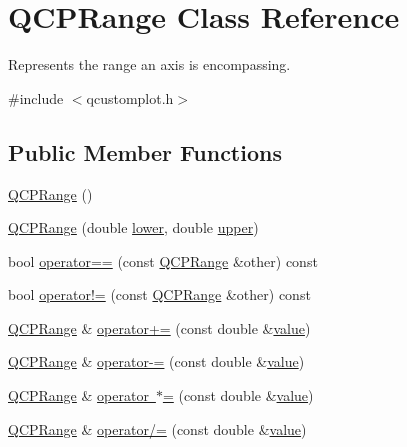 \hypertarget{class_q_c_p_range}{}\section{Q\+C\+P\+Range Class Reference}
\label{class_q_c_p_range}


Represents the range an axis is encompassing.  




{\ttfamily \#include $<$qcustomplot.\+h$>$}

\subsection*{Public Member Functions}
\begin{DoxyCompactItemize}
\item 
\mbox{\hyperlink{class_q_c_p_range_aca158d7e69702cee5d77d10a269b01e2}{Q\+C\+P\+Range}} ()
\item 
\mbox{\hyperlink{class_q_c_p_range_a1d9d84d084c8f368fdedd42e0978d405}{Q\+C\+P\+Range}} (double \mbox{\hyperlink{class_q_c_p_range_aa3aca3edb14f7ca0c85d912647b91745}{lower}}, double \mbox{\hyperlink{class_q_c_p_range_ae44eb3aafe1d0e2ed34b499b6d2e074f}{upper}})
\item 
bool \mbox{\hyperlink{class_q_c_p_range_a9f8d1fdcf4b6d19779f1c3d9a14b09c9}{operator==}} (const \mbox{\hyperlink{class_q_c_p_range}{Q\+C\+P\+Range}} \&other) const
\item 
bool \mbox{\hyperlink{class_q_c_p_range_a4827a37c83b8bb4bf53fcf8f6a257e77}{operator!=}} (const \mbox{\hyperlink{class_q_c_p_range}{Q\+C\+P\+Range}} \&other) const
\item 
\mbox{\hyperlink{class_q_c_p_range}{Q\+C\+P\+Range}} \& \mbox{\hyperlink{class_q_c_p_range_afea7c1aa7d08f061cd9bd8832f957df8}{operator+=}} (const double \&\mbox{\hyperlink{diffusion_8cpp_a4b41795815d9f3d03abfc739e666d5da}{value}})
\item 
\mbox{\hyperlink{class_q_c_p_range}{Q\+C\+P\+Range}} \& \mbox{\hyperlink{class_q_c_p_range_a95894bcb15a16a75ca564091374e2191}{operator-\/=}} (const double \&\mbox{\hyperlink{diffusion_8cpp_a4b41795815d9f3d03abfc739e666d5da}{value}})
\item 
\mbox{\hyperlink{class_q_c_p_range}{Q\+C\+P\+Range}} \& \mbox{\hyperlink{class_q_c_p_range_aabf53e9f8285574863f7cc30e0919a93}{operator $\ast$=}} (const double \&\mbox{\hyperlink{diffusion_8cpp_a4b41795815d9f3d03abfc739e666d5da}{value}})
\item 
\mbox{\hyperlink{class_q_c_p_range}{Q\+C\+P\+Range}} \& \mbox{\hyperlink{class_q_c_p_range_a6137d8682b6835ace840730b4c1e2d63}{operator/=}} (const double \&\mbox{\hyperlink{diffusion_8cpp_a4b41795815d9f3d03abfc739e666d5da}{value}})

\end{DoxyCompactItemize}
